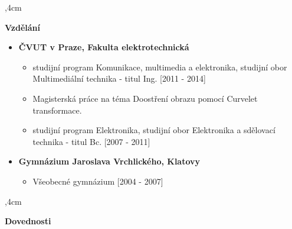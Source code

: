 \documentclass[10pt]{article}
\begin{document}
\noindent\hrulefill
{},4cm


\textbf{Vzdělání}

\begin{itemize}
    \item [\faGraduationCap]\textbf{ČVUT v Praze, Fakulta elektrotechnická }
    \begin{itemize}
        \item studijní program Komunikace, multimedia a elektronika, studijní obor Multimediální technika - titul Ing. [2011 - 2014]
        \item Magisterská práce na téma Doostření obrazu pomocí Curvelet transformace.
        \item studijní program Elektronika, studijní obor Elektronika a sdělovací technika - titul Bc. [2007 - 2011]
    \end{itemize}
    \item[\faGraduationCap] \textbf{Gymnázium Jaroslava Vrchlického, Klatovy }
    \begin{itemize}
        \item Všeobecné gymnázium [2004 - 2007]
    \end{itemize}
\end{itemize}

\noindent\hrulefill
{},4cm

\clearpage

\textbf{Dovednosti}
\end{document}
